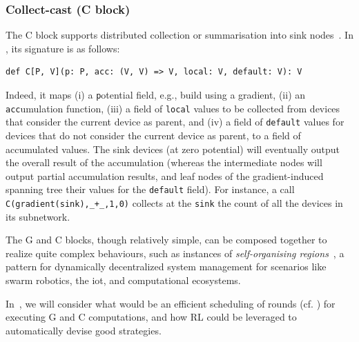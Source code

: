 \subsubsection{Collect-cast (C block)}
%
The C block supports distributed collection or summarisation into sink nodes~\cite{DBLP:journals/cee/AudritoCDPV21}.
%
In \scafi{}, its signature is as follows:
\begin{lstlisting}
def C[P, V](p: P, acc: (V, V) => V, local: V, default: V): V
\end{lstlisting}
Indeed, it maps 
 (i) a \lstinline|p|otential field, e.g., build using a gradient,
 (ii) %
 an \lstinline|acc|umulation function,
 (iii) a field of \lstinline|local| values to be collected from devices that consider the current device as parent,
 and
 (iv) a field of \lstinline|default| values for devices that do not consider the current device as parent,
 to a field of accumulated values.
%
The sink devices (at zero potential)
 will eventually output the overall result of the accumulation (whereas the intermediate nodes will output partial accumulation results, and leaf nodes of the gradient-induced spanning tree their values for the \lstinline|default| field).
%
For instance, a call 
 \lstinline|C(gradient(sink),_+_,1,0)|
 collects at the \lstinline|sink| the count of all the devices in its subnetwork.


The G and C blocks, though relatively simple,
 can be composed together to 
 realize quite complex behaviours,
 such as instances
 of \emph{self-organising regions}~\cite{DBLP:journals/fgcs/PianiniCVN21},
 a pattern for dynamically decentralized %
  system management 
 for scenarios
 like swarm robotics, the \ac{iot}, 
 and computational ecosystems.
%

In~,
 we will consider
 what would be an efficient scheduling of rounds
 (cf. )
 for executing G and C computations,
 and how \ac{RL} could 
 be leveraged to automatically devise good strategies.


